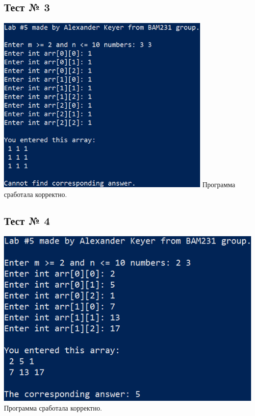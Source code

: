 \documentclass[12pt]{article}
\begin{document}
	\subsection*{Тест № 3}
	\includegraphics[width=400px]{test_3}
	Программа сработала корректно.
	
	\subsection*{Тест № 4}
	\includegraphics[width=400pt]{test_4}
	Программа сработала корректно.
	
\end{document}
